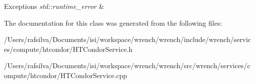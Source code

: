 \begin{DoxyExceptions}{Exceptions}
{\em std\+::runtime\+\_\+error} & \\
\hline
\end{DoxyExceptions}


The documentation for this class was generated from the following files\+:\begin{DoxyCompactItemize}
\item 
/\+Users/rafsilva/\+Documents/isi/workspace/wrench/wrench/include/wrench/services/compute/htcondor/H\+T\+Condor\+Service.\+h\item 
/\+Users/rafsilva/\+Documents/isi/workspace/wrench/wrench/src/wrench/services/compute/htcondor/H\+T\+Condor\+Service.\+cpp\end{DoxyCompactItemize}
